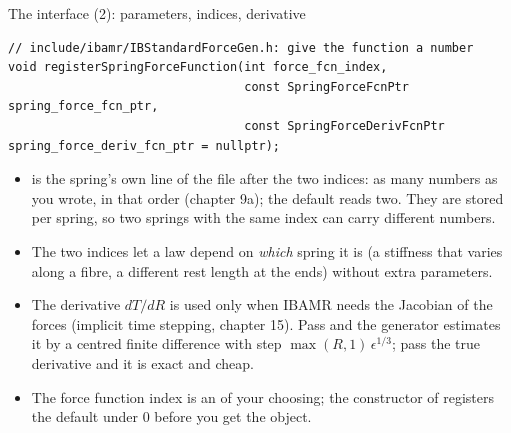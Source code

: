 \documentclass[aspectratio=169,11pt]{beamer}
\begin{document}
\begin{frame}[fragile]{The interface (2): parameters, indices, derivative}
\label{fr:interface2}
\begin{lstlisting}[style=cpptiny]
// include/ibamr/IBStandardForceGen.h: give the function a number
void registerSpringForceFunction(int force_fcn_index,
                                 const SpringForceFcnPtr spring_force_fcn_ptr,
                                 const SpringForceDerivFcnPtr spring_force_deriv_fcn_ptr = nullptr);
\end{lstlisting}
\begin{itemize}\footnotesize
  \item {} is the spring's own line of the file after the two indices: as many numbers as you wrote, in that order (chapter 9a); the default reads two. They are stored per spring, so two springs with the same index can carry different numbers.
  \item The two indices let a law depend on \emph{which} spring it is (a stiffness that varies along a fibre, a different rest length at the ends) without extra parameters.
  \item The derivative $dT/dR$ is used only when IBAMR needs the Jacobian of the forces (implicit time stepping, chapter 15). Pass  and the generator estimates it by a centred finite difference with step $\max(R,1)\,\epsilon^{1/3}$; pass the true derivative and it is exact and cheap.
  \item The force function index is an  of your choosing; the constructor of  registers the default under 0 before you get the object.
\end{itemize}
\end{frame}
\end{document}
